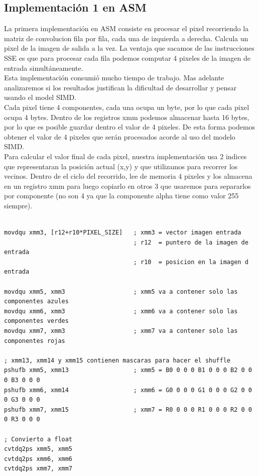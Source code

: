 \documentclass[10pt,a4paper,spanish]{article}
\begin{document}
\subsection{Implementación 1 en ASM}

La primera implementación en ASM consiste en procesar el pixel recorriendo la matriz de convolucion fila por fila, cada una de izquierda a derecha.
Calcula un pixel de la imagen de salida a la vez. La ventaja que sacamos de las instrucciones SSE es que para procesar cada fila podemos computar 4 pixeles de la imagen de entrada simultáneamente. \\

Esta implementación consumió mucho tiempo de trabajo. Mas adelante analizaremos si los resultados justifican la dificultad de desarrollar y pensar usando el model SIMD. \\

Cada pixel tiene 4 componentes, cada una ocupa un byte, por lo que cada pixel ocupa 4 bytes. Dentro de los registros xmm podemos almacenar hasta 16 bytes, por lo que es posible guardar dentro el valor de 4 pixeles. De esta forma podemos obtener el valor de 4 pixeles que serán procesados acorde al uso del modelo SIMD. \\

Para calcular el valor final de cada pixel, nuestra implementación usa 2 indices que representaran la posición actual (x,y) y que utilizamos para recorrer los vecinos. Dentro de el ciclo del recorrido, lee de memoria 4 pixeles y los almacena en un registro xmm para luego copiarlo en otros 3 que usaremos para separarlos por componente (no son 4 ya que la componente alpha tiene como valor 255 siempre).

\begin{codesnippet}
\begin{verbatim}
	
movdqu xmm3, [r12+r10*PIXEL_SIZE]   ; xmm3 = vector imagen entrada
                                    ; r12  = puntero de la imagen de entrada
                                    ; r10  = posicion en la imagen d entrada

movdqu xmm5, xmm3                   ; xmm5 va a contener solo las componentes azules
movdqu xmm6, xmm3                   ; xmm6 va a contener solo las componentes verdes
movdqu xmm7, xmm3                   ; xmm7 va a contener solo las componentes rojas	

; xmm13, xmm14 y xmm15 contienen mascaras para hacer el shuffle
pshufb xmm5, xmm13                  ; xmm5 = B0 0 0 0 B1 0 0 0 B2 0 0 0 B3 0 0 0
pshufb xmm6, xmm14                  ; xmm6 = G0 0 0 0 G1 0 0 0 G2 0 0 0 G3 0 0 0
pshufb xmm7, xmm15                  ; xmm7 = R0 0 0 0 R1 0 0 0 R2 0 0 0 R3 0 0 0

; Convierto a float
cvtdq2ps xmm5, xmm5
cvtdq2ps xmm6, xmm6
cvtdq2ps xmm7, xmm7

\end{verbatim}
\end{codesnippet}
\end{document}
